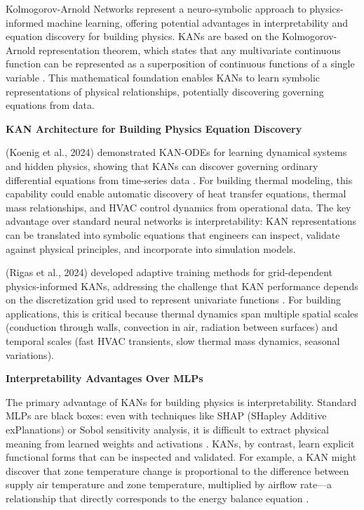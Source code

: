 \documentclass[12pt,a4paper]{article}
\begin{document}
Kolmogorov-Arnold Networks represent a neuro-symbolic approach to physics-informed machine learning, offering potential advantages in interpretability and equation discovery for building physics. KANs are based on the Kolmogorov-Arnold representation theorem, which states that any multivariate continuous function can be represented as a superposition of continuous functions of a single variable \cite{ref39}. This mathematical foundation enables KANs to learn symbolic representations of physical relationships, potentially discovering governing equations from data.

\textbf{KAN Architecture for Building Physics Equation Discovery}

(Koenig et al., 2024) demonstrated KAN-ODEs for learning dynamical systems and hidden physics, showing that KANs can discover governing ordinary differential equations from time-series data \cite{ref40}. For building thermal modeling, this capability could enable automatic discovery of heat transfer equations, thermal mass relationships, and HVAC control dynamics from operational data. The key advantage over standard neural networks is interpretability: KAN representations can be translated into symbolic equations that engineers can inspect, validate against physical principles, and incorporate into simulation models.

(Rigas et al., 2024) developed adaptive training methods for grid-dependent physics-informed KANs, addressing the challenge that KAN performance depends on the discretization grid used to represent univariate functions \cite{ref41}. For building applications, this is critical because thermal dynamics span multiple spatial scales (conduction through walls, convection in air, radiation between surfaces) and temporal scales (fast HVAC transients, slow thermal mass dynamics, seasonal variations).

\textbf{Interpretability Advantages Over MLPs}

The primary advantage of KANs for building physics is interpretability. Standard MLPs are black boxes: even with techniques like SHAP (SHapley Additive exPlanations) or Sobol sensitivity analysis, it is difficult to extract physical meaning from learned weights and activations \cite{ref42}. KANs, by contrast, learn explicit functional forms that can be inspected and validated. For example, a KAN might discover that zone temperature change is proportional to the difference between supply air temperature and zone temperature, multiplied by airflow rate---a relationship that directly corresponds to the energy balance equation \cite{ref43}.
\end{document}
